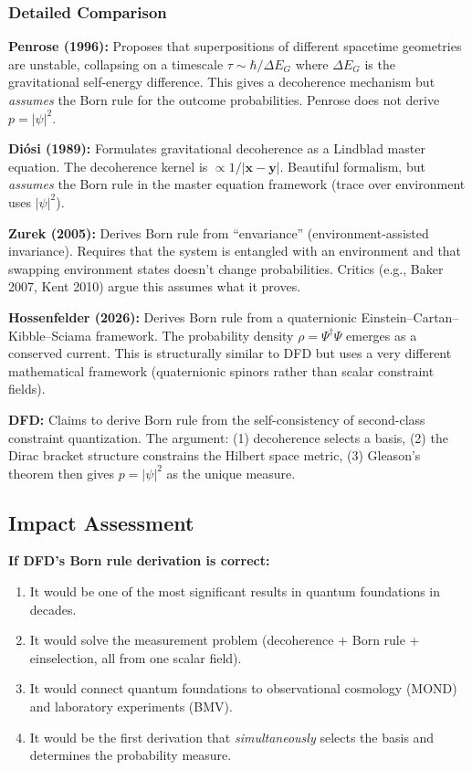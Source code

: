 \documentclass[11pt,a4paper]{article}
\begin{document}
\subsubsection{Detailed Comparison}

\textbf{Penrose (1996):} Proposes that superpositions of different spacetime geometries are unstable, collapsing on a timescale $\tau \sim \hbar/\Delta E_G$ where $\Delta E_G$ is the gravitational self-energy difference. This gives a decoherence mechanism but \emph{assumes} the Born rule for the outcome probabilities. Penrose does not derive $p = |\psi|^2$.

\textbf{Di\'{o}si (1989):} Formulates gravitational decoherence as a Lindblad master equation. The decoherence kernel is $\propto 1/|\mathbf{x}-\mathbf{y}|$. Beautiful formalism, but \emph{assumes} the Born rule in the master equation framework (trace over environment uses $|\psi|^2$).

\textbf{Zurek (2005):} Derives Born rule from ``envariance'' (environment-assisted invariance). Requires that the system is entangled with an environment and that swapping environment states doesn't change probabilities. Critics (e.g., Baker 2007, Kent 2010) argue this assumes what it proves.

\textbf{Hossenfelder (2026):} Derives Born rule from a quaternionic Einstein--Cartan--Kibble--Sciama framework. The probability density $\rho = \Psi^\dagger\Psi$ emerges as a conserved current. This is structurally similar to DFD but uses a very different mathematical framework (quaternionic spinors rather than scalar constraint fields).

\textbf{DFD:} Claims to derive Born rule from the self-consistency of second-class constraint quantization. The argument: (1) decoherence selects a basis, (2) the Dirac bracket structure constrains the Hilbert space metric, (3) Gleason's theorem then gives $p = |\psi|^2$ as the unique measure.

\subsection{Impact Assessment}

\textbf{If DFD's Born rule derivation is correct:}

\begin{enumerate}
\item It would be one of the most significant results in quantum foundations in decades.
\item It would solve the measurement problem (decoherence + Born rule + einselection, all from one scalar field).
\item It would connect quantum foundations to observational cosmology (MOND) and laboratory experiments (BMV).
\item It would be the first derivation that \emph{simultaneously} selects the basis and determines the probability measure.
\end{enumerate}
\end{document}
